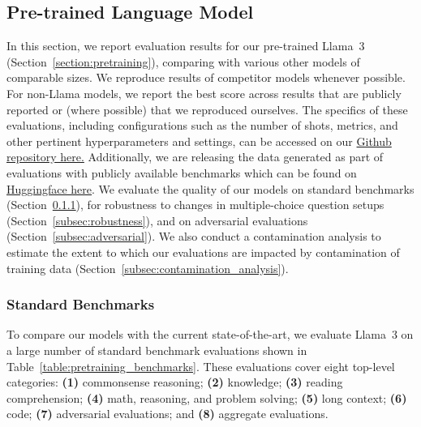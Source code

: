\newcommand{\dieuwke}[1]{\textcolor{green!60!black}{DH: #1}}
\newcommand{\lovish}[1]{\textcolor{green!60!black}{LM: #1}}
\newcommand{\TBD}[1]{\textcolor{red!80!black}{\textbf{TBD:} #1}}

\subsection{Pre-trained Language Model}\label{results:pretrained_lm}

In this section, we report evaluation results for our pre-trained Llama~3 (Section~\ref{section:pretraining}), comparing with various other models of comparable sizes. We reproduce results of competitor models whenever possible. For non-Llama models, we report the best score across results that are publicly reported or (where possible) that we reproduced ourselves. The specifics of these evaluations, including configurations such as the number of shots, metrics, and other pertinent hyperparameters and settings, can be accessed on our \href{https://github.com/meta-llama/llama-models/blob/main/models/llama3_1/eval_details.md}{Github repository here.} Additionally, we are releasing the data generated as part of evaluations with publicly available benchmarks which can be found on \href{https://huggingface.co/meta-llama}{Huggingface here}. We evaluate the quality of our models on standard benchmarks (Section~\ref{subsec:automatic_benchmarks}), for robustness to changes in multiple-choice question setups (Section~\ref{subsec:robustness}), and on adversarial evaluations (Section~\ref{subsec:adversarial}). 
We also conduct a contamination analysis to estimate the extent to which our evaluations are impacted by contamination of training data (Section~\ref{subsec:contamination_analysis}).

\subsubsection{Standard Benchmarks}
\label{subsec:automatic_benchmarks}

To compare our models with the current state-of-the-art, we evaluate Llama~3 on a large number of standard benchmark evaluations shown in Table~\ref{table:pretraining_benchmarks}.
These evaluations cover eight top-level categories: \textbf{(1)} commonsense reasoning; \textbf{(2)} knowledge; \textbf{(3)} reading comprehension; \textbf{(4)} math, reasoning, and problem solving; \textbf{(5)} long context; \textbf{(6)} code; \textbf{(7)} adversarial evaluations; and \textbf{(8)} aggregate evaluations.

